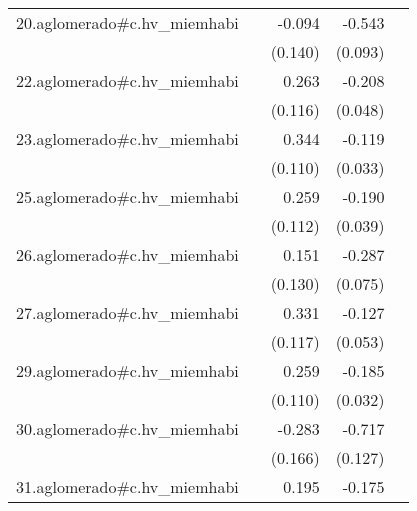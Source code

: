 {\begin{longtable}{l*{4}{D{.}{.}{-1}}}
\addlinespace
20.aglomerado#c.hv\_miemhabi&                     &      -0.094         &      -0.543\sym{***}&                     \\
            &                     &     (0.140)         &     (0.093)         &                     \\
\addlinespace
22.aglomerado#c.hv\_miemhabi&                     &       0.263\sym{*}  &      -0.208\sym{***}&                     \\
            &                     &     (0.116)         &     (0.048)         &                     \\
\addlinespace
23.aglomerado#c.hv\_miemhabi&                     &       0.344\sym{**} &      -0.119\sym{***}&                     \\
            &                     &     (0.110)         &     (0.033)         &                     \\
\addlinespace
25.aglomerado#c.hv\_miemhabi&                     &       0.259\sym{*}  &      -0.190\sym{***}&                     \\
            &                     &     (0.112)         &     (0.039)         &                     \\
\addlinespace
26.aglomerado#c.hv\_miemhabi&                     &       0.151         &      -0.287\sym{***}&                     \\
            &                     &     (0.130)         &     (0.075)         &                     \\
\addlinespace
27.aglomerado#c.hv\_miemhabi&                     &       0.331\sym{**} &      -0.127\sym{*}  &                     \\
            &                     &     (0.117)         &     (0.053)         &                     \\
\addlinespace
29.aglomerado#c.hv\_miemhabi&                     &       0.259\sym{*}  &      -0.185\sym{***}&                     \\
            &                     &     (0.110)         &     (0.032)         &                     \\
\addlinespace
30.aglomerado#c.hv\_miemhabi&                     &      -0.283         &      -0.717\sym{***}&                     \\
            &                     &     (0.166)         &     (0.127)         &                     \\
\addlinespace
31.aglomerado#c.hv\_miemhabi&                     &       0.195         &      -0.175\sym{***}&                     \\

\end{longtable}}
